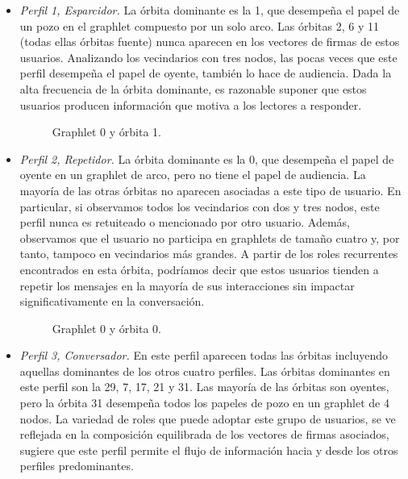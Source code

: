 \begin{itemize} 

\item \emph{Perfil 1, Esparcidor.} La órbita dominante es la 1, que desempeña el papel de un pozo en el graphlet compuesto por un solo arco. Las órbitas 2, 6 y 11 (todas ellas órbitas fuente) nunca aparecen en los vectores de firmas de estos usuarios. Analizando los vecindarios con tres nodos, las pocas veces que este perfil desempeña el papel de oyente, también lo hace de audiencia. Dada la alta frecuencia de la órbita dominante, es razonable suponer que estos usuarios producen información que motiva a los lectores a responder. \begin{figure}[htbp]
   \centering
   
    \caption{Graphlet 0 y órbita 1.}
    \label{img:web-comp}
\end{figure}

\item \emph{Perfil 2, Repetidor.} La órbita dominante es la 0, que desempeña el papel de oyente en un graphlet de arco, pero no tiene el papel de audiencia. La mayoría de las otras órbitas no aparecen asociadas a este tipo de usuario. En particular, si observamos todos los vecindarios con dos y tres nodos, este perfil nunca es retuiteado o mencionado por otro usuario. Además, observamos que el usuario no participa en graphlets de tamaño cuatro y, por tanto, tampoco en vecindarios más grandes. A partir de los roles recurrentes encontrados en esta órbita, podríamos decir que estos usuarios tienden a repetir los mensajes en la mayoría de sus interacciones sin impactar significativamente en la conversación. \begin{figure}[htbp]
   \centering
   
    \caption{Graphlet 0 y órbita 0.}
    \label{img:web-comp}
\end{figure}

\item \emph{Perfil 3, Conversador.} En este perfil aparecen todas las órbitas incluyendo aquellas dominantes de los otros cuatro perfiles. Las órbitas dominantes en este perfil son la 29, 7, 17, 21 y 31. Las mayoría de las órbitas son oyentes, pero la órbita 31 desempeña todos los papeles de pozo en un graphlet de 4 nodos. La variedad de roles que puede adoptar este grupo de usuarios, se ve reflejada en la composición equilibrada de los vectores de firmas asociados, sugiere que este perfil permite el flujo de información hacia y desde los otros perfiles predominantes.
    

\end{itemize}
